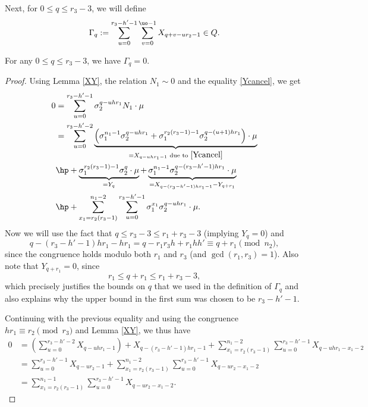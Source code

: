 Next, for $0\leq q \leq r_3-3$, we will define 
\begin{equation}\label{Gamma}
\Gamma_q:=\sum_{u=0}^{r_3-h'-1}\sum_{v=0}^{\uo-1}X_{q+v-ur_2-1}\in Q.
\end{equation}
\pagebreak
\begin{lemma}\label{G0}
For any $0\leq q \leq r_3-3$, we have $\Gamma_q=0$.
\end{lemma}
\begin{proof}
Using Lemma \ref{XY}, the relation $N_1\sim 0$ and the equality \eqref{Ycancel}, 
we get
\begin{align*}
0&= \sum_{u=0}^{r_3-h'-1} \sigma_2^{q-uhr_1}N_1\cdot \mu\\
&= \sum_{u=0}^{r_3-h'-2}  \underbrace{\left(\sigma_1^{n_1-1}\sigma_2^{q-uh r_1} +\sigma_1^{r_2(r_3-1)-1}\sigma_2^{q-(u+1)h r_1}\right)\cdot \mu}_{=X_{q-uhr_1-1} \text{ due to } \eqref{Ycancel}}\\
&\hp+\underbrace{\sigma_1^{r_2(r_3-1)-1}\sigma_2^q\cdot \mu}_{=Y_q}+
\underbrace{\sigma_1^{n_1-1}\sigma_2^{q-(r_3-h'-1)h r_1}\cdot\mu}_{=X_{q-(r_3-h'-1)hr_1-1}-Y_{q+r_1}}\\
&\hp+\sum_{x_1=r_2(r_3-1)}^{n_1-2}\sum_{u=0}^{r_3-h'-1} \sigma_1^{x_1}\sigma_2^{q-uh r_1}\cdot \mu.
\end{align*}
Now we will use the fact that $q\leq r_3-3\leq r_1+r_3-3$ (implying $Y_q=0$) and $$q-(r_3-h'-1)h r_1-hr_1=q-r_1r_3h+r_1hh'\equiv q+r_1\pmod{n_2},$$ since the congruence holds modulo both $r_1$ and $r_3$ (and $\gcd(r_1,r_3)=1$). Also note that $Y_{q+r_1}=0$, since
$$r_1\leq q+r_1\leq r_1+r_3-3,$$
which precisely justifies the bounds on $q$ that we used in the definition of $\Gamma_q$ and also explains why the upper bound in the first sum was chosen to be $r_3-h'-1$.

Continuing with the previous equality and using the congruence $hr_1\equiv r_2\pmod{r_3}$ and Lemma \ref{XY}, we thus have
\begin{align*}
0&= \left(\sum_{u=0}^{r_3-h'-2} X_{q-uhr_1-1}\right)+X_{q-(r_3-h'-1)hr_1-1}+\sum_{x_1=r_2(r_3-1)}^{n_1-2}\sum_{u=0}^{r_3-h'-1} X_{q-uh r_1-x_1-2}\\
&=\sum_{u=0}^{r_3-h'-1} X_{q-ur_2-1}+\sum_{x_1=r_2(r_3-1)}^{n_1-2}\sum_{u=0}^{r_3-h'-1} X_{q-ur_2-x_1-2}\\
&=\sum_{x_1=r_2(r_3-1)}^{n_1-1}\sum_{u=0}^{r_3-h'-1} X_{q-ur_2-x_1-2}.
\end{align*}


\end{proof}
